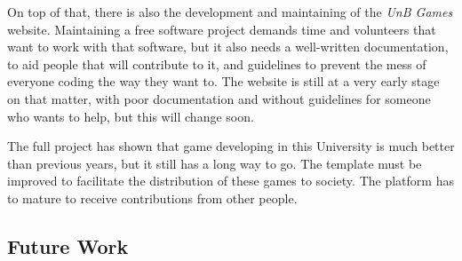 On top of that, there is also the development and maintaining of the \textit{UnB Games} website. Maintaining a free software project demands time and volunteers that want to work with that software, but it also needs a well-written documentation, to aid people that will contribute to it, and guidelines to prevent the mess of everyone coding the way they want to. The website is still at a very early stage on that matter, with poor documentation and without guidelines for someone who wants to help, but this will change soon.

The full project has shown that game developing in this University is much better than previous years, but it still has a long way to go. The template must be improved to facilitate the distribution of these games to society. The platform has to mature to receive contributions from other people.


\subsection*{Future Work}
\label{sec:future}
